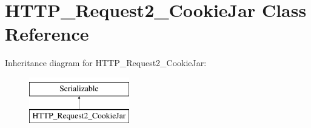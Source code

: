 \hypertarget{classHTTP__Request2__CookieJar}{\section{H\-T\-T\-P\-\_\-\-Request2\-\_\-\-Cookie\-Jar Class Reference}
\label{classHTTP__Request2__CookieJar}
}
Inheritance diagram for H\-T\-T\-P\-\_\-\-Request2\-\_\-\-Cookie\-Jar\-:\begin{figure}[H]
\begin{center}
\leavevmode
\includegraphics[height=2.000000cm]{classHTTP__Request2__CookieJar}
\end{center}
\end{figure}
